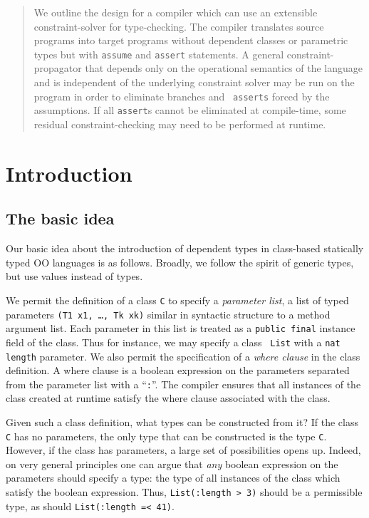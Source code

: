 \documentclass{article}
\begin{document}
\begin{abstract}
We outline the design for a compiler which can use an extensible
constraint-solver for type-checking. The compiler translates source
programs into target programs without dependent classes or parametric
types but with {\tt assume} and {\tt assert} statements. A general
constraint-propagator that depends only on the operational semantics
of the language and is independent of the underlying constraint solver
may be run on the program in order to eliminate branches and {\tt
asserts} forced by the assumptions. If all {\tt assert}s cannot be
eliminated at compile-time, some residual constraint-checking
may need to be performed at runtime.
\end{abstract}

\section{Introduction}
\subsection{The basic idea}

Our basic idea about the introduction of dependent types in
class-based statically typed OO languages is as follows. Broadly, we
follow the spirit of generic types, but use values instead of
types. 

We permit the definition of a class {\tt C} to specify a {\em
parameter list}, a list of typed parameters {\tt (T1 x1, \ldots, Tk
xk)} similar in syntactic structure to a method argument list. Each
parameter in this list is treated as a {\tt public final} instance
field of the class. Thus for instance, we may specify a class {\tt
List} with a {\tt nat length} parameter.  We also permit the
specification of a {\em where clause} in the class definition. A where
clause is a boolean expression on the parameters separated from the
parameter list with a ``{\tt :}''.  The compiler ensures that all
instances of the class created at runtime satisfy the where clause
associated with the class.

Given such a class definition, what types can be constructed from it?
If the class {\tt C} has no parameters, the only type that can be
constructed is the type {\tt C}. However, if the class has parameters,
a large set of possibilities opens up. Indeed, on very general
principles one can argue that {\em any} boolean expression on the
parameters should specify a type: the type of all instances of the
class which satisfy the boolean expression. Thus, 
{\tt List(:length > 3)} should be a permissible type, as should 
{\tt List(:length =< 41)}.
\end{document}
